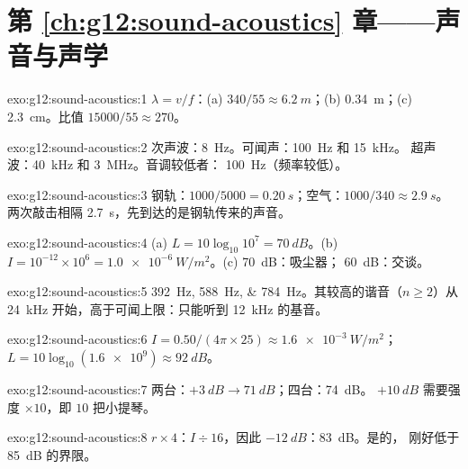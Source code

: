 \section*{第 \ref{ch:g12:sound-acoustics} 章——声音与声学}

\begin{solution}{exo:g12:sound-acoustics:1}
$\lambda = v/f$：(a) $340/55 \approx \qty{6.2}{m}$；(b)
\qty{0.34}{m}；(c) \qty{2.3}{cm}。比值 $15000/55 \approx 270$。
\end{solution}

\begin{solution}{exo:g12:sound-acoustics:2}
次声波：\qty{8}{Hz}。可闻声：\qty{100}{Hz} 和 \qty{15}{kHz}。
超声波：\qty{40}{kHz} 和 \qty{3}{MHz}。音调较低者：
\qty{100}{Hz}（频率较低）。
\end{solution}

\begin{solution}{exo:g12:sound-acoustics:3}
钢轨：$1000/5000 = \qty{0.20}{s}$；空气：$1000/340 \approx
\qty{2.9}{s}$。两次敲击相隔 \qty{2.7}{s}，先到达的是钢轨传来的声音。
\end{solution}

\begin{solution}{exo:g12:sound-acoustics:4}
(a) $L = 10\log_{10}10^{7} = \qty{70}{dB}$。(b) $I = 10^{-12} \times
10^{6} = \qty{1.0e-6}{W/m^2}$。(c) \qty{70}{dB}：吸尘器；
\qty{60}{dB}：交谈。
\end{solution}

\begin{solution}{exo:g12:sound-acoustics:5}
\qtylist{392;588;784}{Hz}。其较高的谐音（$n \ge 2$）从
\qty{24}{kHz} 开始，高于可闻上限：只能听到 \qty{12}{kHz}
的基音。
\end{solution}

\begin{solution}{exo:g12:sound-acoustics:6}
$I = 0.50/(4\pi \times 25) \approx \qty{1.6e-3}{W/m^2}$；
$L = 10\log_{10}(\num{1.6e9}) \approx \qty{92}{dB}$。
\end{solution}

\begin{solution}{exo:g12:sound-acoustics:7}
两台：$+\qty{3}{dB} \to \qty{71}{dB}$；四台：\qty{74}{dB}。
$+\qty{10}{dB}$ 需要强度 $\times 10$，即 $10$ 把小提琴。
\end{solution}

\begin{solution}{exo:g12:sound-acoustics:8}
$r \times 4$：$I \div 16$，因此 $-\qty{12}{dB}$：\qty{83}{dB}。是的，
刚好低于 \qty{85}{dB} 的界限。
\end{solution}

